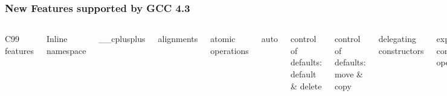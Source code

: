 \begin{frame}[fragile]
\frametitle{New Features {\textcolor{TerumoOrange}{supported by GCC 4.3}}}

\begin{columns}[t]

{\scriptsize
C99 features

Inline namespace

\_\_cplusplus

alignments

atomic operations

auto

control of defaults: default \& delete

control of defaults: move \& copy


delegating constructors

explicit conversion operators

extended integer types


lambdas

null pointer (nullptr)


}
{\scriptsize
attributes: {[[carries\_dependency]]}, [[noreturn]]

Dynamic Initialization and Destruction with Concurrency

Uniform initialization syntax and semantics

constant expressions (constexpr)

copying and rethrowing exceptions

enum class (scoped and strongly typed enums)

exception propagation (preventing it; noexcept)

in-class member initializers

inherited constructors

initializer lists (uniform and general initialization)

local classes as template arguments

long long integers (at least 64 bits)

narrowing (how to prevent it)

override controls: final, override


suffix return type syntax

}
\end{columns}
\end{frame}

